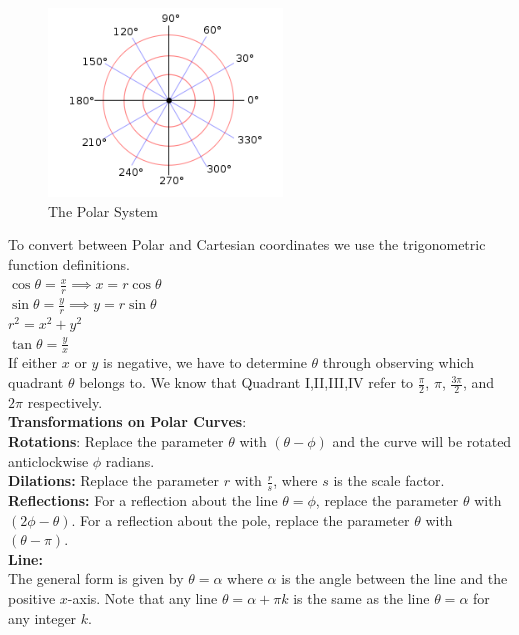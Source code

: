 \documentclass{article}
\begin{document}
            \begin{figure} [hbt!]
                \centering
                \includegraphics[scale=0.8]{Resources/Unit3Vectors/polar.PNG}
                \caption*{The Polar System}
            \end{figure}

            \noindent To convert between Polar and Cartesian coordinates we use the trigonometric
            function definitions. \\
            $\cos\theta=\frac{x}{r}\implies x=r\cos\theta$ \\
            $\sin\theta=\frac{y}{r}\implies y=r\sin\theta$ \\
            $r^2=x^2+y^2$ \\
            $\tan\theta=\frac{y}{x}$ \\
            \noindent If either $x$ or $y$ is negative, we have to determine $\theta$ through
            observing which quadrant $\theta$ belongs to. We know that Quadrant I,II,III,IV refer to
            $\frac{\pi}{2}$, $\pi$, $\frac{3\pi}{2}$, and $2\pi$ respectively. \\

            \noindent \textbf{Transformations on Polar Curves}: \\
            \textbf{Rotations}: Replace the parameter $\theta$ with $(\theta-\phi)$ and the curve
            will be rotated anticlockwise $\phi$ radians. \\
            \textbf{Dilations:} Replace the parameter $r$ with $\frac{r}{s}$, where $s$ is the scale
            factor. \\
            \textbf{Reflections:} For a reflection about the line $\theta=\phi$, replace the parameter
            $\theta$ with $(2\phi-\theta)$. For a reflection about the pole, replace the parameter
            $\theta$ with $(\theta-\pi)$. \\

            \noindent \textbf{Line:} \\
            The general form is given by $\theta=\alpha$ where $\alpha$ is the angle between the line
            and the positive $x$-axis. Note that any line $\theta=\alpha+\pi k$ is the same as the
            line $\theta=\alpha$ for any integer $k$. \\
\end{document}
